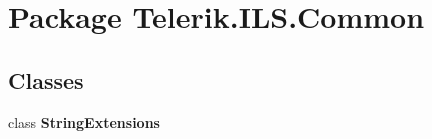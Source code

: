 \hypertarget{namespace_telerik_1_1_i_l_s_1_1_common}{\section{Package Telerik.\-I\-L\-S.\-Common}
\label{namespace_telerik_1_1_i_l_s_1_1_common}
}
\subsection*{Classes}
\begin{DoxyCompactItemize}
\item 
class {\bfseries String\-Extensions}
\end{DoxyCompactItemize}
